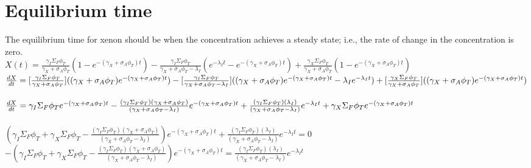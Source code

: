 \documentclass[11pt,a4paper]{article}
\begin{document}
\section{Equilibrium time}
\noindent The equilibrium time for xenon should be when the concentration achieves a steady state; i.e., the rate of change in the concentration is zero. \\


$X(t)=\frac{\gamma_I\Sigma_F\phi_T}{\gamma_X+\sigma_A\phi_T}(1-e^{-(\gamma_X+\sigma_A\phi_T)t})-\frac{\gamma_I\Sigma_F\phi_T}{\gamma_X+\sigma_A\phi_T-\lambda_I}(e^{-\lambda_I t}-e^{-(\gamma_X+\sigma_A\phi_T)t})+\frac{\gamma_X\Sigma_F\phi_T}{\gamma_X+\sigma_A\phi_T}(1-e^{-(\gamma_X+\sigma_A\phi_T)t})$ \\

\noindent $\frac{dX}{dt}=[\frac{\gamma_I\Sigma_F\phi_T}{\gamma_X+\sigma_A\phi_T}]((\gamma_X+\sigma_A\phi_T)e^{-(\gamma_X+\sigma_A\phi_T)t})-[\frac{\gamma_I\Sigma_F\phi_T}{\gamma_X+\sigma_A\phi_T-\lambda_I}]((\gamma_X+\sigma_A\phi_T)e^{-(\gamma_X+\sigma_A\phi_T)t}-\lambda_Ie^{-\lambda_I t}) \\ +[\frac{\gamma_X\Sigma_F\phi_T}{\gamma_X+\sigma_A\phi_T}]((\gamma_X+\sigma_A\phi_T)e^{-(\gamma_X+\sigma_A\phi_T)t})$ \\ \\

\noindent $\frac{dX}{dt}=\gamma_I\Sigma_F\phi_T e^{-(\gamma_X+\sigma_A\phi_T)t} \\
-\frac{(\gamma_I\Sigma_F\phi_T)(\gamma_X+\sigma_A\phi_T)}{(\gamma_X+\sigma_A\phi_T-\lambda_I)}e^{-(\gamma_X+\sigma_A\phi_T)t} \\
+\frac{(\gamma_I\Sigma_F\phi_T)(\lambda_I)}{(\gamma_X+\sigma_A\phi_T-\lambda_I)}e^{-\lambda_I t} \\
+\gamma_X\Sigma_F\phi_T e^{-(\gamma_X+\sigma_A\phi_T)t}$ \\ \\

\noindent $(\gamma_I\Sigma_F\phi_T+\gamma_X\Sigma_F\phi_T-\frac{(\gamma_I\Sigma_F\phi_T)(\gamma_X+\sigma_A\phi_T)}{(\gamma_X+\sigma_A\phi_T-\lambda_I)})e^{-(\gamma_X+\sigma_A\phi_T)t}+\frac{(\gamma_I\Sigma_F\phi_T)(\lambda_I)}{(\gamma_X+\sigma_A\phi_T-\lambda_I)}e^{-\lambda_I t}=0$ \\

\noindent $-(\gamma_I\Sigma_F\phi_T+\gamma_X\Sigma_F\phi_T-\frac{(\gamma_I\Sigma_F\phi_T)(\gamma_X+\sigma_A\phi_T)}{(\gamma_X+\sigma_A\phi_T-\lambda_I)})e^{-(\gamma_X+\sigma_A\phi_T)t}=\frac{(\gamma_I\Sigma_F\phi_T)(\lambda_I)}{(\gamma_X+\sigma_A\phi_T-\lambda_I)}e^{-\lambda_I t}$ \\
\end{document}

